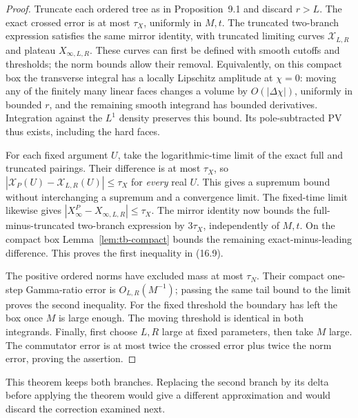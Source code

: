 \begin{proof}
Truncate each ordered tree as in Proposition~9.1 and discard $r>L$.
The exact crossed error is at most $\tau_X$, uniformly in $M,t$.
The truncated two-branch expression satisfies the same mirror identity,
with truncated limiting curves $\mathcal X_{L,R}$ and plateau
$X_{\infty,L,R}$. These curves can first be defined with smooth cutoffs
and thresholds; the norm bounds allow their removal. Equivalently,
on this compact box the transverse integral has a locally Lipschitz
amplitude at $\chi=0$: moving any of the finitely many linear faces
changes a volume by $O(|\Delta\chi|)$, uniformly in bounded $r$, and
the remaining smooth integrand has bounded derivatives. Integration
against the $L^1$ density preserves this bound. Its pole-subtracted
PV thus exists, including the hard faces.

For each fixed argument $U$, take the logarithmic-time limit of the
exact full and truncated pairings. Their difference is at most
$\tau_X$, so $|\mathcal X_P(U)-\mathcal X_{L,R}(U)|\le\tau_X$
for \emph{every} real $U$. This gives a supremum bound without
interchanging a supremum and a convergence limit. The fixed-time limit
likewise gives $|X^P_\infty-X_{\infty,L,R}|\le\tau_X$.
The mirror identity now bounds the full-minus-truncated two-branch
expression by $3\tau_X$, independently of $M,t$. On the compact box
Lemma~\ref{lem:tb-compact} bounds the remaining exact-minus-leading
difference. This proves the first inequality in (16.9).

The positive ordered norms have excluded mass at most $\tau_N$.
Their compact one-step Gamma-ratio error is $O_{L,R}(M^{-1})$;
passing the same tail bound to the limit proves the second inequality.
For the fixed threshold the boundary has left the box once $M$ is
large enough. The moving threshold is identical in both integrands.
Finally, first choose $L,R$ large at fixed parameters, then take $M$
large. The commutator error is at most twice the crossed error plus
twice the norm error, proving the assertion.
\end{proof}
This theorem keeps both branches. Replacing the second branch by its
delta before applying the theorem would give a different approximation
and would discard the correction examined next.

